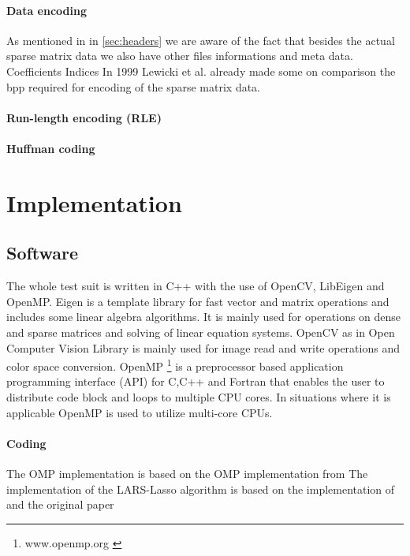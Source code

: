 \paragraph{Data encoding}
As mentioned in in \ref{sec:headers} we are aware of the fact that besides the actual sparse matrix data we also have other files informations and meta data.
Coefficients
Indices
In 1999 Lewicki et al. \cite{Lewicki1999} already made some on comparison the bpp required for encoding of the sparse matrix data.
\cite{Murray2006}

\paragraph{Run-length encoding (RLE)}
\paragraph{Huffman coding}




\section{Implementation}
%

\subsection*{Software}
The whole test suit is written in C++ with the use of OpenCV, LibEigen and OpenMP.
Eigen \cite{Eigen} is a template library for fast vector and matrix operations and includes some linear algebra algorithms.
It is mainly used for operations on dense and sparse matrices and solving of linear equation systems.
OpenCV \cite{OpenCV} as in Open Computer Vision Library is mainly used for image read and write operations and color space conversion.
OpenMP \footnote{www.openmp.org \cite{OpenMP}} is a preprocessor based application programming interface (API) for C,C++ and Fortran that enables 
the user to distribute code block and loops to multiple CPU cores. 
In situations where it is applicable OpenMP is used to utilize multi-core CPUs. 

\paragraph{Coding}
The OMP implementation is based on the OMP implementation from \cite{Rubinstein}
The implementation of the LARS-Lasso algorithm is based on the implementation of \cite{Strand2005} and the original paper \cite{Efron2004}

